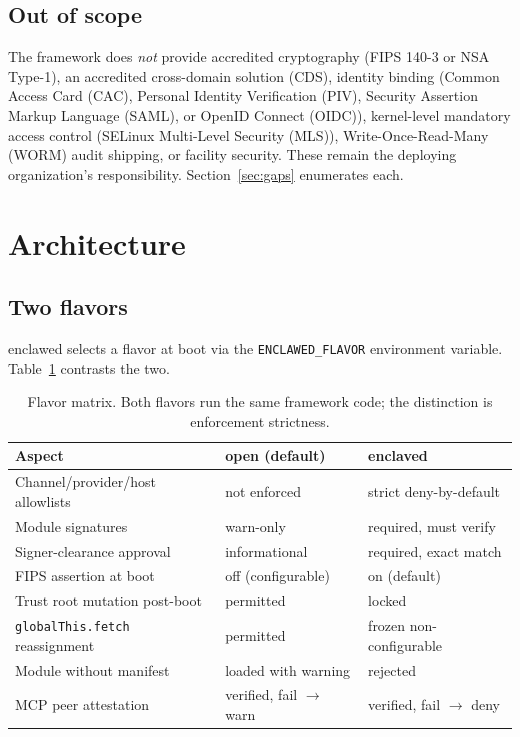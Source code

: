 \documentclass[11pt]{article}
\begin{document}
\subsection{Out of scope}

The framework does \emph{not} provide accredited cryptography
(FIPS 140-3 or NSA Type-1), an accredited cross-domain solution (CDS),
identity binding (Common Access Card (CAC), Personal Identity
Verification (PIV), Security Assertion Markup Language (SAML), or
OpenID Connect (OIDC)), kernel-level mandatory access control
(SELinux Multi-Level Security (MLS)), Write-Once-Read-Many (WORM)
audit shipping, or facility security. These remain the deploying
organization's responsibility. Section~\ref{sec:gaps} enumerates each.

\section{Architecture}

\subsection{Two flavors}

enclawed selects a flavor at boot via the \texttt{ENCLAWED\_FLAVOR}
environment variable. Table~\ref{tab:flavors} contrasts the two.

\begin{table}[t]
  \centering
  \small
  \begin{tabular}{|p{3.7cm}|p{5cm}|p{5cm}|}
    \hline
    \textbf{Aspect} & \textbf{open (default)} & \textbf{enclaved} \\
    \hline
    Channel/provider/host allowlists & not enforced & strict deny-by-default \\
    \hline
    Module signatures & warn-only & required, must verify \\
    \hline
    Signer-clearance approval & informational & required, exact match \\
    \hline
    FIPS assertion at boot & off (configurable) & on (default) \\
    \hline
    Trust root mutation post-boot & permitted & locked \\
    \hline
    \texttt{globalThis.fetch} reassignment & permitted & frozen non-configurable \\
    \hline
    Module without manifest & loaded with warning & rejected \\
    \hline
    MCP peer attestation & verified, fail $\to$ warn & verified, fail $\to$ deny \\
    \hline
  \end{tabular}
  \caption{Flavor matrix. Both flavors run the same framework code; the
  distinction is enforcement strictness.}
  \label{tab:flavors}
\end{table}
\end{document}
